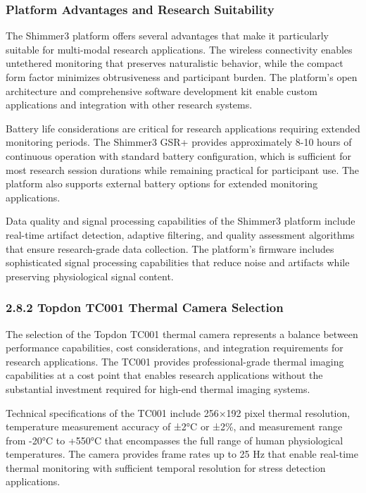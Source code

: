 \documentclass[12pt,a4paper]{article}
\begin{document}
\subsubsection{Platform Advantages and Research Suitability}

The Shimmer3 platform offers several advantages that make it particularly suitable for multi-modal research
applications. The wireless connectivity enables untethered monitoring that preserves naturalistic behavior, while the
compact form factor minimizes obtrusiveness and participant burden. The platform's open architecture and comprehensive
software development kit enable custom applications and integration with other research systems.

Battery life considerations are critical for research applications requiring extended monitoring periods. The Shimmer3
GSR+ provides approximately 8-10 hours of continuous operation with standard battery configuration, which is sufficient
for most research session durations while remaining practical for participant use. The platform also supports external
battery options for extended monitoring applications.

Data quality and signal processing capabilities of the Shimmer3 platform include real-time artifact detection, adaptive
filtering, and quality assessment algorithms that ensure research-grade data collection. The platform's firmware
includes sophisticated signal processing capabilities that reduce noise and artifacts while preserving physiological
signal content.

\subsubsection{2.8.2 Topdon TC001 Thermal Camera Selection}

The selection of the Topdon TC001 thermal camera represents a balance between performance capabilities, cost
considerations, and integration requirements for research applications. The TC001 provides professional-grade thermal
imaging capabilities at a cost point that enables research applications without the substantial investment required for
high-end thermal imaging systems.

Technical specifications of the TC001 include 256×192 pixel thermal resolution, temperature measurement accuracy of ±2°C
or ±2\%, and measurement range from -20°C to +550°C that encompasses the full range of human physiological temperatures.
The camera provides frame rates up to 25 Hz that enable real-time thermal monitoring with sufficient temporal resolution
for stress detection applications.
\end{document}
